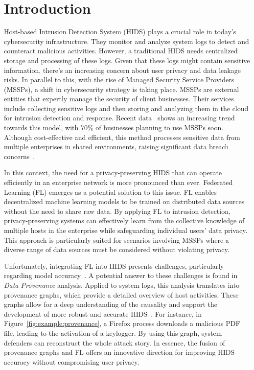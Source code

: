 \section{Introduction}
\label{s:intro}

Host-based Intrusion Detection System (HIDS) plays a crucial role in today's cybersecurity infrastructure. They monitor and analyze system logs to detect and counteract malicious activities. However, a traditional HIDS needs centralized storage and processing of these logs. Given that these logs might contain sensitive information, there's an increasing concern about user privacy and data leakage risks. In parallel to this, with the rise of Managed Security Service Providers (MSSPs), a shift in cybersecurity strategy is taking place. MSSPs are external entities that expertly manage the security of client businesses. Their services include collecting sensitive logs and then storing and analyzing them in the cloud for intrusion detection and response. Recent data~\cite{study-mssp} shows an increasing trend towards this model, with 70\% of businesses planning to use MSSPs soon. Although cost-effective and efficient, this method processes sensitive data from multiple enterprises in shared environments, raising significant data breach concerns~\cite{attack-mssp}.

In this context, the need for a privacy-preserving HIDS that can operate efficiently in an enterprise network is more pronounced than ever. Federated Learning (FL) emerges as a potential solution to this issue. FL enables decentralized machine learning models to be trained on distributed data sources without the need to share raw data. By applying FL to intrusion detection, privacy-preserving systems can effectively learn from the collective knowledge of multiple hosts in the enterprise while safeguarding individual users' data privacy. This approach is particularly suited for scenarios involving MSSPs where a diverse range of data sources must be considered without violating privacy.

Unfortunately, integrating FL into HIDS presents challenges, particularly regarding model accuracy~\cite{bonawitz2019towards}. A potential answer to these challenges is found in \textit{Data Provenance} analysis. Applied to system logs, this analysis translates into provenance graphs, which provide a detailed overview of host activities. These graphs allow for a deep understanding of the causality and support the development of more robust and accurate HIDS~\cite{provdetector2020,rapsheet2020,shadewatcher}. For instance, in Figure~\ref{fig:example:provenance}, a Firefox process downloads a malicious PDF file, leading to the activation of a keylogger. By using this graph, system defenders can reconstruct the whole attack story. In essence, the fusion of provenance graphs and FL offers an innovative direction for improving HIDS accuracy without compromising user privacy.
